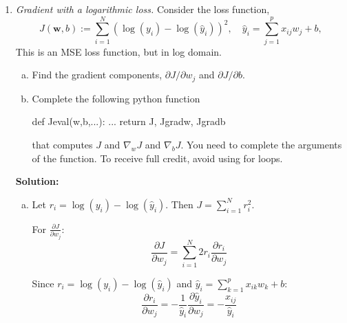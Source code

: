 \documentclass[11pt]{article}
\newcommand{\wbf}{\mathbf{w}}
\begin{document}
\begin{enumerate}
\begin{enumerate}[(a)]
$$\frac{\partial J}{\partial w_2} = e^{z_1z_2}(1 + z_1z_2) \cdot a_1w_1 + z_1^2e^{z_1z_2} \cdot 2a_3w_2 = e^{z_1z_2}[a_1w_1(1 + z_1z_2) + 2a_3w_2z_1^2]$$

\item 
\begin{python}
def Jeval(w, a):
    w1, w2 = w[0], w[1]
    a1, a2, a3 = a[0], a[1], a[2]
    
    # Compute intermediate variables
    z1 = a1 * w1 * w2
    z2 = a2 * w1 + a3 * w2**2
    
    # Compute J
    J = z1 * np.exp(z1 * z2)
    
    # Compute gradients
    exp_term = np.exp(z1 * z2)
    grad_w1 = exp_term * (a1 * w2 * (1 + z1 * z2) + a2 * z1**2)
    grad_w2 = exp_term * (a1 * w1 * (1 + z1 * z2) + 2 * a3 * w2 * z1**2)
    
    return J, np.array([grad_w1, grad_w2])
\end{python}
\end{enumerate}

\item \emph{Gradient with a logarithmic loss.}  Consider the loss function,
\[
    J(\wbf,b) := \sum_{i=1}^N (\log(y_i)-\log(\hat{y}_i))^2,
    \quad \hat{y}_i = \sum_{j=1}^p x_{ij}w_j + b,
\]
This is an MSE loss function, but in log domain.
\begin{enumerate}[(a)]
\item Find the gradient components, $\partial J/\partial w_j$ and $\partial J/\partial b$.
\item Complete the following python function
\begin{python}
    def Jeval(w,b,...):
        ...
        return J, Jgradw, Jgradb
\end{python}
that computes $J$ and $\nabla_w J$ and $\nabla_b J$.
You need to complete the arguments of the function.
To receive full credit, avoid using for loops.
\end{enumerate}

\textbf{Solution:}
\begin{enumerate}[(a)]
\item Let $r_i = \log(y_i) - \log(\hat{y}_i)$. Then $J = \sum_{i=1}^N r_i^2$.

For $\frac{\partial J}{\partial w_j}$:
$$\frac{\partial J}{\partial w_j} = \sum_{i=1}^N 2r_i \frac{\partial r_i}{\partial w_j}$$

Since $r_i = \log(y_i) - \log(\hat{y}_i)$ and $\hat{y}_i = \sum_{k=1}^p x_{ik}w_k + b$:
$$\frac{\partial r_i}{\partial w_j} = -\frac{1}{\hat{y}_i} \frac{\partial \hat{y}_i}{\partial w_j} = -\frac{x_{ij}}{\hat{y}_i}$$


\end{enumerate}
\end{enumerate}
\end{document}
